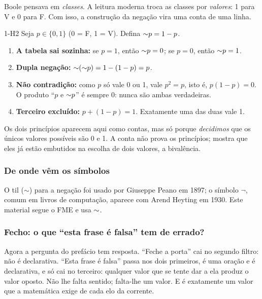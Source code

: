 Boole pensava em \emph{classes}. A leitura moderna troca as classes por \emph{valores}: 1 para V e 0 para F. Com isso, a construção da negação vira uma conta de uma linha.

\begin{construcao}{1-H2}
Seja $p\in\{0,1\}$ (0 = F, 1 = V). Defina ${\sim} p = 1-p$.
\begin{enumerate}[label=(\arabic*)]
  \item \textbf{A tabela sai sozinha:} se $p=1$, então ${\sim} p = 0$; \quad se $p=0$, então ${\sim} p = 1$.
  \item \textbf{Dupla negação:} ${\sim}({\sim} p) = 1-(1-p) = p$.
  \item \textbf{Não contradição:} como $p$ só vale 0 ou 1, vale $p^2=p$, isto é, $p(1-p)=0$. O produto \enquote{$p$ e ${\sim} p$} é sempre 0: nunca são ambas verdadeiras.
  \item \textbf{Terceiro excluído:} $p + (1-p) = 1$. Exatamente uma das duas vale 1.
\end{enumerate}
\end{construcao}

Os dois princípios aparecem aqui como contas, mas só porque \emph{decidimos} que os únicos valores possíveis são 0 e 1. A conta não prova os princípios; mostra que eles já estão embutidos na escolha de dois valores, a bivalência.

\subsubsection{De onde vêm os símbolos}
O til ($\sim$) para a negação foi usado por Giuseppe Peano em 1897; o símbolo $\neg$, comum em livros de computação, aparece com Arend Heyting em 1930. Este material segue o FME e usa ${\sim}$.

\subsubsection{Fecho: o que \enquote{esta frase é falsa} tem de errado?}
Agora a pergunta do prefácio tem resposta. \enquote{Feche a porta} cai no segundo filtro: não é declarativa. \enquote{Esta frase é falsa} passa nos dois primeiros, é uma oração e é declarativa, e só cai no terceiro: qualquer valor que se tente dar a ela produz o valor oposto. Não lhe falta sentido; falta-lhe um valor. E é exatamente um valor que a matemática exige de cada elo da corrente.

